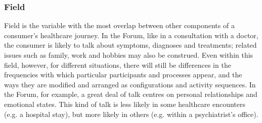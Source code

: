 

\subsubsection{Field}

Field is the variable with the most overlap between other components of a consumer's healthcare journey. In the \gls{Forum}, like in a consultation with a doctor, the consumer is likely to talk about symptoms, diagnoses and treatments; related issues such as family, work and hobbies may also be construed. Even within this field, however, for different situations, there will still be differences in the frequencies with which particular participants and processes appear, and the ways they are modified and arranged as configurations and activity sequences. In the Forum, for example, a great deal of talk centres on personal relationships and emotional states. This kind of talk is less likely in some healthcare encounters (e.g. a hospital stay), but more likely in others (e.g. within a psychiatrist's office).


